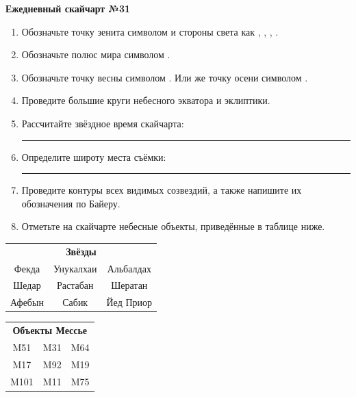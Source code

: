 \documentclass{./SAS-class-skygen}
\begin{document}
    
    
    
	\begin{center}
		\large\textbf{Ежедневный скайчарт №31}
	\end{center}

	\begin{enumerate}
		\item Обозначьте точку зенита символом  и стороны света как , , , .
		\item Обозначьте полюс мира символом .
		\item Обозначьте точку весны символом \Aries. Или же точку осени символом \Libra.
		\item Проведите большие круги небесного экватора и эклиптики.
		\item Рассчитайте звёздное время скайчарта: \rule{2cm}{0.4pt}
		\item Определите широту места съёмки: \rule{2cm}{0.4pt}
		\item Проведите контуры всех видимых созвездий, а также напишите их обозначения по Байеру.
		\item Отметьте на скайчарте небесные объекты, приведённые в таблице ниже.
	\end{enumerate}
	
    \vspace{0.5cm}

    \begin{table}[h!]
    \centering
    \begin{tabular}{ccc}
    \multicolumn{3}{c}{\textbf{Звёзды}} \\ Фекда & Унукалхаи & Альбалдах \\
Шедар & Растабан & Шератан \\
Афебын & Сабик & Йед Приор \\

\end{tabular}
    \hfill
    \begin{tabular}{ccc}
    \multicolumn{3}{c}{\textbf{Объекты Мессье}} \\ M51 & M31 & M64 \\
M17 & M92 & M19 \\
M101 & M11 & M75 \\

\end{tabular}
    \end{table}
	
\end{document}
